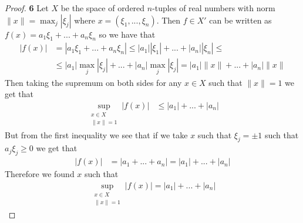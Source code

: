 \documentclass[11pt]{article}
\theoremstyle{definition}
\begin{document}
\begin{proof}{\textbf{6}}
    Let $X$ be the space of ordered $n$-tuples of real numbers with norm
    $\|x\| = \max_j |\xi_j|$ where $x = (\xi_1, ..., \xi_n)$.
    Then $f \in X'$ can be written as $f(x) = a_1\xi_1 + ... + a_n\xi_n$
    so we have that 
    \begin{align*}
        |f(x)| &= |a_1\xi_1 + ... + a_n\xi_n|
        \leq |a_1||\xi_1| + ... + |a_n||\xi_n| \leq\\
        &\leq |a_1|\max_j|\xi_j| + ... + |a_n|\max_j|\xi_j|
        = |a_1|\|x\| + ... + |a_n|\|x\|
    \end{align*}
    Then taking the supremum on both sides for any $x \in X$ such that
    $\|x\| = 1$ we get that
    \begin{align*}
        \sup_{\substack{x \in X \\ \|x\| = 1}} |f(x)| &\leq |a_1| + ... + |a_n|
    \end{align*}
    But from the first inequality we see that if we take $x$ such that
    $\xi_j = \pm 1$ such that $a_j\xi_j \geq 0$ we get that 
    \begin{align*}
        |f(x)| &= |a_1 + ... + a_n| = |a_1| + ... + |a_n|
    \end{align*}
    Therefore we found $x$ such that 
    \begin{align*}
        \sup_{\substack{x \in X \\ \|x\| = 1}} |f(x)| = |a_1| + ... + |a_n|
    \end{align*}
\end{proof}
\cleardoublepage
\end{document}
